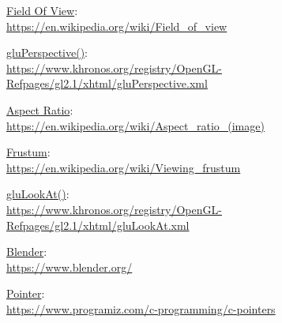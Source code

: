 \documentclass[12pt]{article}
\begin{document}
\begin{thebibliography}{9}

\underline{Field Of View}:\\
\url{https://en.wikipedia.org/wiki/Field_of_view}

\underline{gluPerspective()}:\\
\url{https://www.khronos.org/registry/OpenGL-Refpages/gl2.1/xhtml/gluPerspective.xml}

\underline{Aspect Ratio}:\\
\url{https://en.wikipedia.org/wiki/Aspect_ratio_(image)}

\underline{Frustum}:\\
\url{https://en.wikipedia.org/wiki/Viewing_frustum}

\underline{gluLookAt()}:\\
\url{https://www.khronos.org/registry/OpenGL-Refpages/gl2.1/xhtml/gluLookAt.xml}

\underline{Blender}:\\
\url{https://www.blender.org/}

\underline{Pointer}:\\
\url{https://www.programiz.com/c-programming/c-pointers}







\end{thebibliography}
\end{document}
